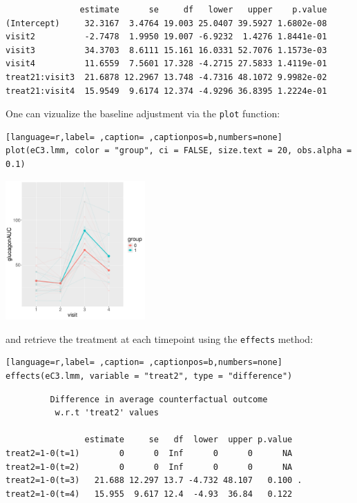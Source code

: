 \documentclass[12pt]{article}
\begin{document}
\begin{verbatim}
               estimate      se     df   lower   upper    p.value
(Intercept)     32.3167  3.4764 19.003 25.0407 39.5927 1.6802e-08
visit2          -2.7478  1.9950 19.007 -6.9232  1.4276 1.8441e-01
visit3          34.3703  8.6111 15.161 16.0331 52.7076 1.1573e-03
visit4          11.6559  7.5601 17.328 -4.2715 27.5833 1.4119e-01
treat21:visit3  21.6878 12.2967 13.748 -4.7316 48.1072 9.9982e-02
treat21:visit4  15.9549  9.6174 12.374 -4.9296 36.8395 1.2224e-01
\end{verbatim}


One can vizualize the baseline adjustment via the \texttt{plot} function:
\begin{lstlisting}[language=r,label= ,caption= ,captionpos=b,numbers=none]
plot(eC3.lmm, color = "group", ci = FALSE, size.text = 20, obs.alpha = 0.1)
\end{lstlisting}

\begin{center}
\includegraphics[width=0.4\textwidth]{./figures/gg-baseAdj.pdf}
\end{center}

and retrieve the treatment at each timepoint using the \texttt{effects} method:
\begin{lstlisting}[language=r,label= ,caption= ,captionpos=b,numbers=none]
effects(eC3.lmm, variable = "treat2", type = "difference")
\end{lstlisting}

\begin{verbatim}
	     Difference in average counterfactual outcome
	      w.r.t 'treat2' values 

                estimate     se   df  lower  upper p.value  
treat2=1-0(t=1)        0      0  Inf      0      0      NA  
treat2=1-0(t=2)        0      0  Inf      0      0      NA  
treat2=1-0(t=3)   21.688 12.297 13.7 -4.732 48.107   0.100 .
treat2=1-0(t=4)   15.955  9.617 12.4  -4.93  36.84   0.122
\end{verbatim}
\end{document}

